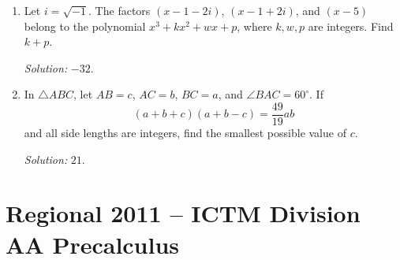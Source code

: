 \documentclass[11pt]{article}
\begin{document}
\begin{enumerate}[label=\textbf{\arabic*.}]
\item Let $i=\sqrt{-1}$. The factors $(x-1-2i)$, $(x-1+2i)$, and $(x-5)$ belong to the polynomial $x^3+kx^2+wx+p$, where $k,w,p$ are integers. Find $k+p$.\par\textit{Solution: }$-32$.

\item In $\triangle ABC$, let $AB=c$, $AC=b$, $BC=a$, and $\angle BAC=60^\circ$. If
\[
(a+b+c)(a+b-c)=\frac{49}{19}ab
\]
and all side lengths are integers, find the smallest possible value of $c$.\par\textit{Solution: }$21$.
\end{enumerate}

\section*{Regional 2011 -- ICTM Division AA Precalculus}
\end{document}
